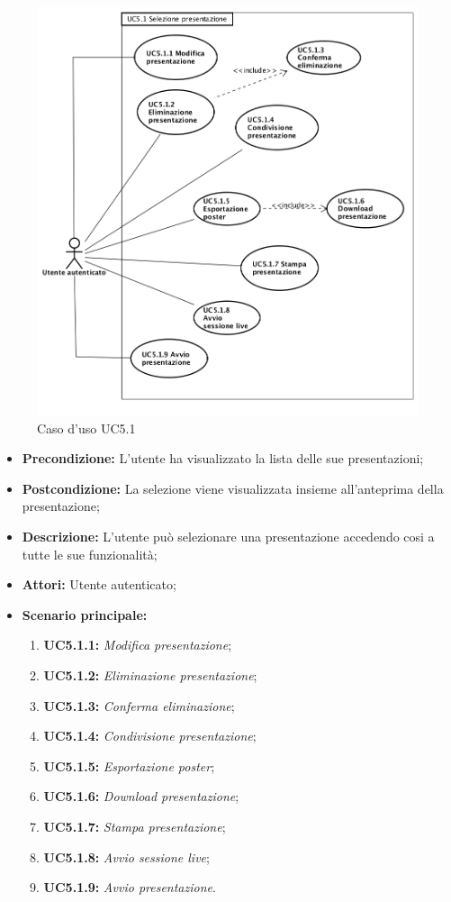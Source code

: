 \begin{figure}[h]
	\begin{center}
	\includegraphics[scale=0.4]{diagram/UC5-1.png}
	\caption{Caso d'uso UC5.1}
	\end{center}
\end{figure}
\begin{itemize}
	\item \textbf{Precondizione:} L'utente ha visualizzato la lista delle sue presentazioni;
	\item \textbf{Postcondizione:} La selezione viene visualizzata insieme all'anteprima della presentazione;
	\item \textbf{Descrizione:} L'utente può selezionare una presentazione accedendo cosi a tutte le sue funzionalità;
	\item \textbf{Attori:} Utente autenticato;
	\item \textbf{Scenario principale:}
	\begin{enumerate}
		\item \textbf{ UC5.1.1:} \textit{ Modifica presentazione};
		\item \textbf{ UC5.1.2:} \textit{ Eliminazione presentazione};
		\item \textbf{ UC5.1.3:} \textit{ Conferma eliminazione};
		\item \textbf{ UC5.1.4:} \textit{ Condivisione presentazione};
		\item \textbf{ UC5.1.5:} \textit{ Esportazione poster};
		\item \textbf{ UC5.1.6:} \textit{ Download presentazione};
		\item \textbf{ UC5.1.7:} \textit{ Stampa presentazione};
		\item \textbf{ UC5.1.8:} \textit{ Avvio sessione live};
		\item \textbf{ UC5.1.9:} \textit{ Avvio presentazione}.
	\end{enumerate}
\end{itemize}
